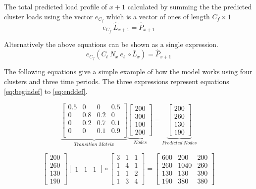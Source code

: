 The total predicted load profile of $x+1$ calculated by summing the the predicted cluster loads using the vector $e_{C_f}$ which is a vector of ones of length $C_f \times 1$
\begin{equation}
e_{C_f} \:\hat{L}_{x+1}= \hat{P}_{x+1}
\end{equation}

Alternatively the above equations can be shown as a single expression. 
\begin{equation}
e_{C_f}(C_t \:N_x \: e_t \: \circ \bar{L}_x) = \hat{P}_{x+1}
\label{eq:enddef}
\end{equation}



The following equations give a simple example of how the model works using four clusters and three time periods. The three expressions represent equations \ref{eq:begindef} to \ref{eq:enddef}.

\begin{equation}
\underbrace{\begin{bmatrix}
0.5 & 0   & 0   & 0.5 \\
 0   & 0.8 & 0.2 & 0   \\
 0   & 0.2 & 0.7 & 0.1   \\
 0   & 0   & 0.1   & 0.9  \\
\end{bmatrix}
}_{Transition \; Matrix}
\underbrace{\begin{bmatrix}
200 \\ 300 \\ 100 \\ 200 
\end{bmatrix}
}_{Nodes}
=
\underbrace{\begin{bmatrix}
200 \\ 260 \\ 130 \\ 190 
\end{bmatrix}
}_{Predicted \:Nodes}
\label{eq:begineaxmple}
\end{equation}

\begin{equation}
\begin{bmatrix}
200 \\ 260 \\ 130 \\ 190 
\end{bmatrix}
\begin{bmatrix}
1 & 1  & 1 
\end{bmatrix}
\circ
\begin{bmatrix}
3 & 1 &1 \\ 
1 &4  & 1\\ 
1 & 1 &2 \\ 
 1& 3 & 4
\end{bmatrix} =
\begin{bmatrix}
600 & 200 &200 \\ 
260 &1040  & 260\\ 
130 & 130 &390 \\ 
 190& 380 & 380
\end{bmatrix}
\end{equation}

